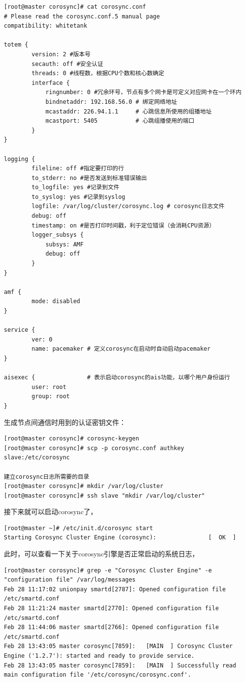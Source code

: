 \begin{verbatim}
[root@master corosync]# cat corosync.conf
# Please read the corosync.conf.5 manual page
compatibility: whitetank

totem {
        version: 2 #版本号
        secauth: off #安全认证
        threads: 0 #线程数，根据CPU个数和核心数确定
        interface {
	        ringnumber: 0 #冗余环号，节点有多个网卡是可定义对应网卡在一个环内
	        bindnetaddr: 192.168.56.0 # 绑定网络地址
	        mcastaddr: 226.94.1.1     # 心跳信息所使用的组播地址
	        mcastport: 5405           # 心跳组播使用的端口
        }
}

logging {
        fileline: off #指定要打印的行
        to_stderr: no #是否发送到标准错误输出
        to_logfile: yes #记录到文件
        to_syslog: yes #记录到syslog
        logfile: /var/log/cluster/corosync.log # corosync日志文件
        debug: off
        timestamp: on #是否打印时间戳，利于定位错误（会消耗CPU资源）
        logger_subsys {
	        subsys: AMF
	        debug: off
        }
}

amf {
        mode: disabled
}

service {
        ver: 0
        name: pacemaker # 定义corosync在启动时自动启动pacemaker
}

aisexec {               # 表示启动corosync的ais功能，以哪个用户身份运行
        user: root
        group: root
}
\end{verbatim}

生成节点间通信时用到的认证密钥文件：

\begin{verbatim}
[root@master corosync]# corosync-keygen
[root@master corosync]# scp -p corosync.conf authkey slave:/etc/corosync

建立corosync日志所需要的目录
[root@master corosync]# mkdir /var/log/cluster
[root@master corosync]# ssh slave "mkdir /var/log/cluster"
\end{verbatim}

接下来就可以启动corosync了，

\begin{verbatim}
[root@master ~]# /etc/init.d/corosync start
Starting Corosync Cluster Engine (corosync):               [  OK  ]
\end{verbatim}

此时，可以查看一下关于corosync引擎是否正常启动的系统日志，

\begin{verbatim}
[root@master corosync]# grep -e "Corosync Cluster Engine" -e "configuration file" /var/log/messages
Feb 28 11:17:02 unionpay smartd[2787]: Opened configuration file /etc/smartd.conf 
Feb 28 11:21:24 master smartd[2770]: Opened configuration file /etc/smartd.conf 
Feb 28 11:44:06 master smartd[2766]: Opened configuration file /etc/smartd.conf 
Feb 28 13:43:05 master corosync[7859]:   [MAIN  ] Corosync Cluster Engine ('1.2.7'): started and ready to provide service.
Feb 28 13:43:05 master corosync[7859]:   [MAIN  ] Successfully read main configuration file '/etc/corosync/corosync.conf'.
\end{verbatim}

